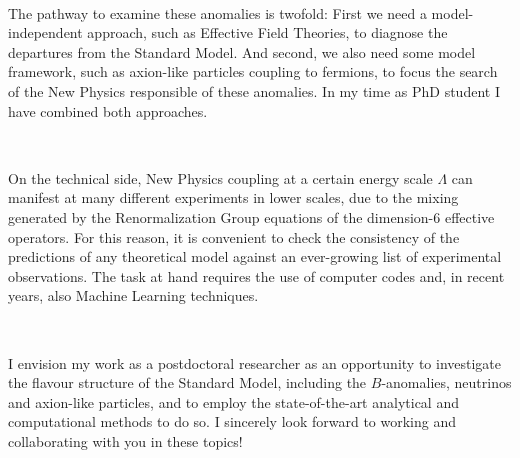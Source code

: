 \documentclass[combined.tex]{subfiles}
\begin{document}
{}~

The pathway to examine these anomalies is twofold: First we need a model-independent approach, such as Effective Field Theories, to diagnose the departures from the Standard Model. And second, we also need some model framework, such as axion-like particles coupling to fermions, to focus the search of the New Physics responsible of these anomalies. In my time as PhD student I have combined both approaches.

{}~

On the technical side, New Physics coupling at a certain energy scale $\Lambda$ can manifest at many different experiments in lower scales, due to the mixing generated by the Renormalization Group equations of the dimension-6 effective operators. For this reason, it is convenient to check the consistency of the predictions of any theoretical model against an ever-growing list of experimental observations. The task at hand requires the use of computer codes and, in recent years, also Machine Learning techniques.

{}~

I envision my work as a postdoctoral researcher as an opportunity to investigate the flavour structure of the Standard Model, including the $B$-anomalies, neutrinos and axion-like particles, and to employ the state-of-the-art analytical and computational methods to do so. I sincerely look forward to working and collaborating with you in these topics!
\end{document}
